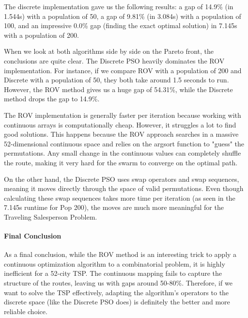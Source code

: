 \documentclass[12pt,a4paper]{article}
\begin{document}
The discrete implementation gave us the following results: a gap of 14.9\% (in 1.544s) with a population of 50, a gap of 9.81\% (in 3.084s) with a population of 100, and an impressive 0.0\% gap (finding the exact optimal solution) in 7.145s with a population of 200. 

When we look at both algorithms side by side on the Pareto front, the conclusions are quite clear. The Discrete PSO heavily dominates the ROV implementation. For instance, if we compare ROV with a population of 200 and Discrete with a population of 50, they both take around 1.5 seconds to run. However, the ROV method gives us a huge gap of 54.31\%, while the Discrete method drops the gap to 14.9\%. 

The ROV implementation is generally faster per iteration because working with continuous arrays is computationally cheap. However, it struggles a lot to find good solutions. This happens because the ROV approach searches in a massive 52-dimensional continuous space and relies on the argsort function to "guess" the permutations. Any small change in the continuous values can completely shuffle the route, making it very hard for the swarm to converge on the optimal path. 

On the other hand, the Discrete PSO uses swap operators and swap sequences, meaning it moves directly through the space of valid permutations. Even though calculating these swap sequences takes more time per iteration (as seen in the 7.145s runtime for Pop 200), the moves are much more meaningful for the Traveling Salesperson Problem.

\paragraph{Final Conclusion}


As a final conclusion, while the ROV method is an interesting trick to apply a continuous optimization algorithm to a combinatorial problem, it is highly inefficient for a 52-city TSP. The continuous mapping fails to capture the structure of the routes, leaving us with gaps around 50-80\%. Therefore, if we want to solve the TSP effectively, adapting the algorithm's operators to the discrete space (like the Discrete PSO does) is definitely the better and more reliable choice.
 
\end{document}
